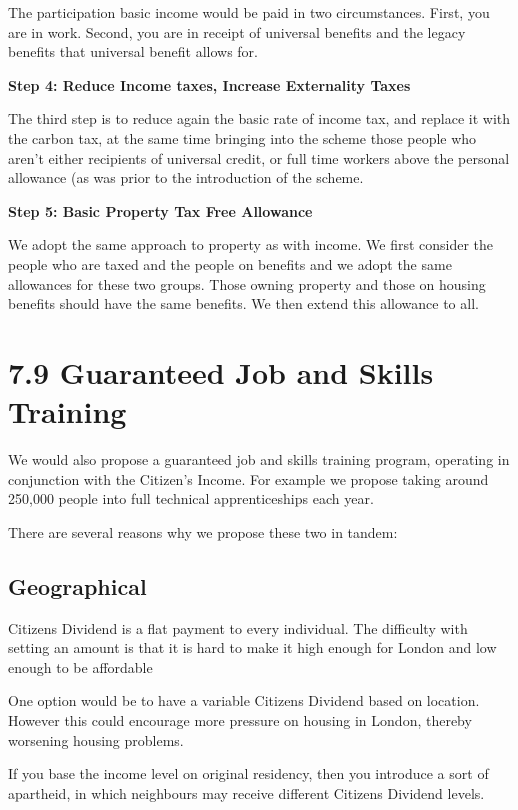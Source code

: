 \documentclass[]{tufte-handout}
\begin{document}
The participation basic income would be paid in two circumstances.
First, you are in work. Second, you are in receipt of universal benefits
and the legacy benefits that universal benefit allows for.

\textbf{Step 4: Reduce Income taxes, Increase Externality Taxes}

The third step is to reduce again the basic rate of income tax, and
replace it with the carbon tax, at the same time bringing into the
scheme those people who aren't either recipients of universal credit, or
full time workers above the personal allowance (as was prior to the
introduction of the scheme.

\textbf{Step 5: Basic Property Tax Free Allowance}

We adopt the same approach to property as with income. We first consider
the people who are taxed and the people on benefits and we adopt the
same allowances for these two groups. Those owning property and those on
housing benefits should have the same benefits. We then extend this
allowance to all.

\hypertarget{guaranteed-job-and-skills-training}{%
\section{7.9 Guaranteed Job and Skills
Training}\label{guaranteed-job-and-skills-training}}

We would also propose a guaranteed job and skills training program,
operating in conjunction with the Citizen's Income. For example we
propose taking around 250,000 people into full technical apprenticeships
each year.

There are several reasons why we propose these two in tandem:

\hypertarget{geographical}{%
\subsection{Geographical}\label{geographical}}

Citizens Dividend is a flat payment to every individual. The difficulty
with setting an amount is that it is hard to make it high enough for
London and low enough to be affordable

One option would be to have a variable Citizens Dividend based on
location. However this could encourage more pressure on housing in
London, thereby worsening housing problems.

If you base the income level on original residency, then you introduce a
sort of apartheid, in which neighbours may receive different Citizens
Dividend levels.
\end{document}

